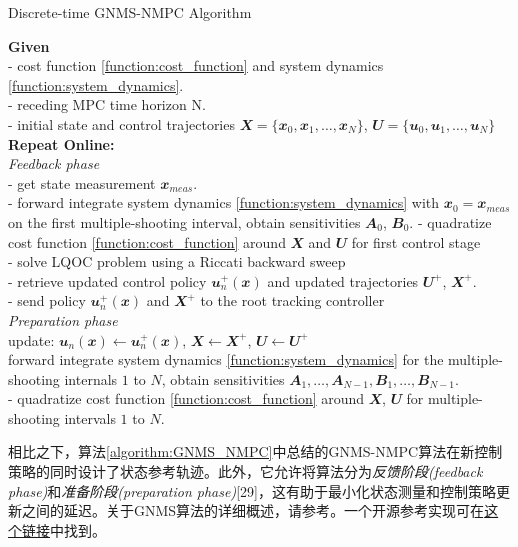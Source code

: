 \begin{algorithm}
    
    \caption[short]{Discrete-time GNMS-NMPC Algorithm}
    \label{algorithm:GNMS_NMPC}
    \textbf{Given}\\
    - cost function \eqref{function:cost_function} and system dynamics \eqref{function:system_dynamics}.\\
    - receding MPC time horizon N.\\
    - initial state and control trajectories $\mathbfit{X}=\{\mathbfit{x}_0, \mathbfit{x}_1, \dots, \mathbfit{x}_N\}$, $\mathbfit{U}=\{\mathbfit{u}_0, \mathbfit{u}_1, \dots, \mathbfit{u}_N\}$\\
    \textbf{Repeat Online:}\\
    \textit{Feedback phase}\\
    - get state measurement $\mathbfit{x}_{meas}$.\\
    - forward integrate system dynamics \eqref{function:system_dynamics} with $\mathbfit{x}_0=\mathbfit{x}_{meas}$ on the first multiple-shooting interval, obtain sensitivities $\mathbfit{A}_0$, $\mathbfit{B}_0$.
    - quadratize cost function \eqref{function:cost_function} around $\mathbfit{X}$ and $\mathbfit{U}$ for first control stage\\
    - solve LQOC problem using a Riccati backward sweep\\
    - retrieve updated control policy $\mathbfit{u}_n^+(\mathbfit{x})$ and updated trajectories $\mathbfit{U}^+$, $\mathbfit{X}^+$.\\
    - send policy $\mathbfit{u}_n^+(\mathbfit{x})$ and $\mathbfit{X}^+$ to the root tracking controller\\
    \textit{Preparation phase}\\
    update: $\mathbfit{u}_n(\mathbfit{x})\leftarrow\mathbfit{u}_n^+(\mathbfit{x})$, $\mathbfit{X}\leftarrow\mathbfit{X}^+$, $\mathbfit{U}\leftarrow\mathbfit{U}^+$\\
    forward integrate system dynamics \eqref{function:system_dynamics} for the multiple-shooting internals $1$ to $N$, obtain sensitivities $\mathbfit{A}_1, \dots, \mathbfit{A}_{N-1}, \mathbfit{B}_1, \dots, \mathbfit{B}_{N-1}$.\\
    - quadratize cost function \eqref{function:cost_function} around $\mathbfit{X}$, $\mathbfit{U}$ for multiple-shooting intervals $1$ to $N$. 
\end{algorithm}

相比之下，算法\ref{algorithm:GNMS_NMPC}中总结的GNMS-NMPC算法在新控制策略的同时设计了状态参考轨迹。此外，它允许将算法分为\emph{反馈阶段(feedback phase)}和\emph{准备阶段(preparation phase)}[29]，这有助于最小化状态测量和控制策略更新之间的延迟。关于GNMS算法的详细概述，请参考\cite[p]{Giftthaler_Neunert_Stäuble_Buchli_Diehl_2017}。一个开源参考实现可在\href{https://adrlab.bitbucket.io/ct}{这个链接}中找到。

